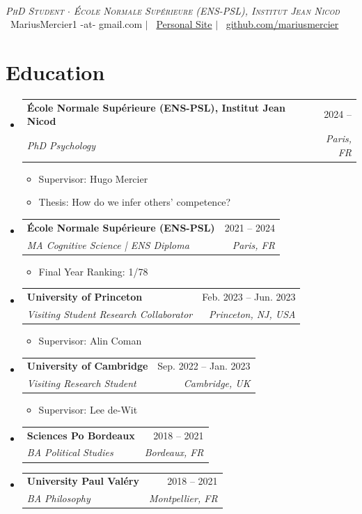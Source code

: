 \documentclass[letterpaper,11pt]{article}
\makeatletter
\newcommand{\resumeItem}[1]{
  \item\small{
    {#1 \vspace{-2pt}}
  }
}
\newcommand{\resumeSubheading}[4]{
  \vspace{1pt}\item
    \begin{tabular*}{0.97\textwidth}[t]{l@{\extracolsep{\fill}}r}
      \textbf{#1} & #2 \\
      \textit{\small#3} & \textit{\small #4} \\
    \end{tabular*}\vspace{-7pt}
}
\newcommand{\resumeSubHeadingListStart}{\begin{itemize}[leftmargin=0.15in, label={}]}
\newcommand{\resumeSubHeadingListEnd}{\end{itemize}}
\newcommand{\resumeItemListStart}{\begin{itemize}}
\newcommand{\resumeItemListEnd}{\end{itemize}\vspace{-5pt}}
\makeatother
\begin{document}

\begin{center}
     \\ \vspace{1pt}
    \textit{\scshape PhD Student $\cdot$ École Normale Supérieure (ENS-PSL), Institut Jean Nicod} \\ \vspace{1pt}
    \small 
    \faEnvelope\ MariusMercier1 -at- gmail.com $|$ 
    \faHome\ \href{https://mariusmercier.github.io}{Personal Site} $|$
    \faGithub\ \href{https://github.com/mariusmercier/}{github.com/mariusmercier}
\end{center}



\section{Education}
  \resumeSubHeadingListStart
    \resumeSubheading
      {École Normale Supérieure (ENS-PSL), Institut Jean Nicod}{2024 --}
      {PhD Psychology}{Paris, FR}
            \resumeItemListStart
        \resumeItem{Supervisor: Hugo Mercier}
        \resumeItem{Thesis: How do we infer others' competence?}
      \resumeItemListEnd
    \resumeSubheading
      {École Normale Supérieure (ENS-PSL)}{2021 -- 2024}
      {MA Cognitive Science | ENS Diploma}{Paris, FR}
            \resumeItemListStart
        \resumeItem{Final Year Ranking: 1/78}            
      \resumeItemListEnd
    \resumeSubheading
      {University of Princeton}{Feb. 2023 -- Jun. 2023}
      {Visiting Student Research Collaborator}{Princeton, NJ, USA}
          \resumeItemListStart
        \resumeItem{Supervisor: Alin Coman}
      \resumeItemListEnd
    \resumeSubheading
      {University of Cambridge}{Sep. 2022 -- Jan. 2023}
      {Visiting Research Student}{Cambridge, UK}
          \resumeItemListStart
        \resumeItem{Supervisor: Lee de-Wit}
      \resumeItemListEnd
    \resumeSubheading
      {Sciences Po Bordeaux}{2018 -- 2021}
      {BA Political Studies}{Bordeaux, FR}
    \resumeSubheading
      {University Paul Valéry}{2018 -- 2021}
      {BA Philosophy}{Montpellier, FR}
  \resumeSubHeadingListEnd
\end{document}
